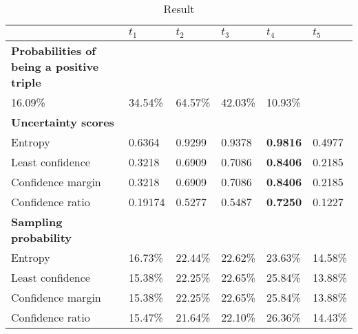 \begin{table}[h]
    \centering
    \begin{tabular}{llllll}
        \toprule
        
        &  \textbf{$t_1$} & \textbf{$t_2$} & \textbf{$t_3$} & \textbf{$t_4$} & \textbf{$t_5$} \\
         
        \midrule
        
        \textbf{Probabilities of being a positive triple}
        & & & & & \\
        
        16.09\% 
        & 34.54\% 
        & 64.57\% 
        & 42.03\% 
        & 10.93\%  \\
        
        \midrule
        \textbf{Uncertainty scores}
        & & & & & \\
        
        Entropy 
        & 0.6364 & 0.9299 & 0.9378 & \textbf{0.9816} & 0.4977 \\
        
        Least confidence 
        & 0.3218 & 0.6909 & 0.7086 & \textbf{0.8406} & 0.2185 \\
        
        Confidence margin
        & 0.3218 & 0.6909 & 0.7086 & \textbf{0.8406} & 0.2185 \\
        
        Confidence ratio
        & 0.19174 & 0.5277 & 0.5487 & \textbf{0.7250} & 0.1227\\
        
        \midrule
        \textbf{Sampling probability}
        & & & & & \\
        
        Entropy 
        & 16.73\% & 22.44\% & 22.62\% & 23.63\% & 14.58\% \\
        
        Least confidence 
        & 15.38\% & 22.25\% & 22.65\% & 25.84\% & 13.88\% \\
       
        Confidence margin
        & 15.38\% & 22.25\% & 22.65\% & 25.84\% & 13.88\% \\
        
        Confidence ratio
        & 15.47\% & 21.64\% & 22.10\% & 26.36\% & 14.43\% \\
        
        \bottomrule
    \end{tabular}
    \caption{Result}
\label{tab:uncertainty_metrics_example_distribution}
\end{table}